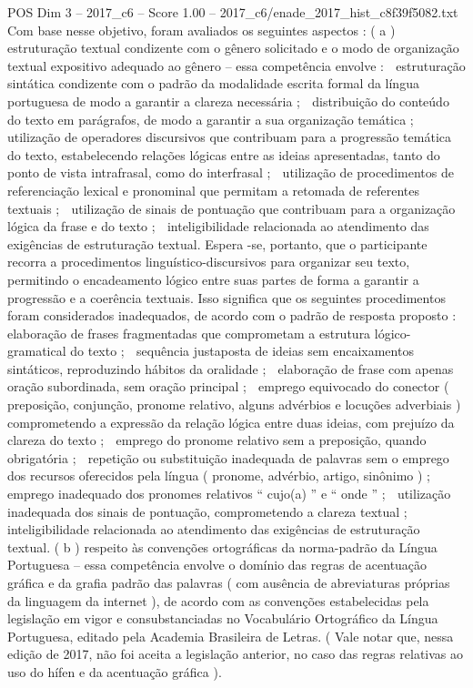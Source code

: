 \begin{textsample}{POS Dim 3 – 2017\_c6 – Score 1.00 – 2017\_c6/enade\_2017\_hist\_c8f39f5082.txt}
Com base nesse objetivo, foram avaliados os seguintes aspectos : ( a ) estruturação textual condizente com o gênero solicitado e o modo de organização textual expositivo adequado ao gênero – essa competência envolve :  estruturação sintática condizente com o padrão da modalidade escrita formal da língua portuguesa de modo a garantir a clareza necessária ;  distribuição do conteúdo do texto em parágrafos, de modo a garantir a sua organização temática ;  utilização de operadores discursivos que contribuam para a progressão temática do texto, estabelecendo relações lógicas entre as ideias apresentadas, tanto do ponto de vista intrafrasal, como do interfrasal ;  utilização de procedimentos de referenciação lexical e pronominal que permitam a retomada de referentes textuais ;  utilização de sinais de pontuação que contribuam para a organização lógica da frase e do texto ;  inteligibilidade relacionada ao atendimento das exigências de estruturação textual.
Espera -se, portanto, que o participante recorra a procedimentos linguístico-discursivos para organizar seu texto, permitindo o encadeamento lógico entre suas partes de forma a garantir a progressão e a coerência textuais.
Isso significa que os seguintes procedimentos foram considerados inadequados, de acordo com o padrão de resposta proposto :  elaboração de frases fragmentadas que comprometam a estrutura lógico-gramatical do texto ;  sequência justaposta de ideias sem encaixamentos sintáticos, reproduzindo hábitos da oralidade ;  elaboração de frase com apenas oração subordinada, sem oração principal ;  emprego equivocado do conector ( preposição, conjunção, pronome relativo, alguns advérbios e locuções adverbiais ) comprometendo a expressão da relação lógica entre duas ideias, com prejuízo da clareza do texto ;  emprego do pronome relativo sem a preposição, quando obrigatória ;  repetição ou substituição inadequada de palavras sem o emprego dos recursos oferecidos pela língua ( pronome, advérbio, artigo, sinônimo ) ;  emprego inadequado dos pronomes relativos “ cujo(a) ” e “ onde ” ;  utilização inadequada dos sinais de pontuação, comprometendo a clareza textual ;  inteligibilidade relacionada ao atendimento das exigências de estruturação textual. ( b ) respeito às convenções ortográficas da norma-padrão da Língua Portuguesa – essa competência envolve o domínio das regras de acentuação gráfica e da grafia padrão das palavras ( com ausência de abreviaturas próprias da linguagem da internet ), de acordo com as convenções estabelecidas pela legislação em vigor e consubstanciadas no Vocabulário Ortográfico da Língua Portuguesa, editado pela Academia Brasileira de Letras. ( Vale notar que, nessa edição de 2017, não foi aceita a legislação anterior, no caso das regras relativas ao uso do hífen e da acentuação gráfica ).

\end{textsample}
